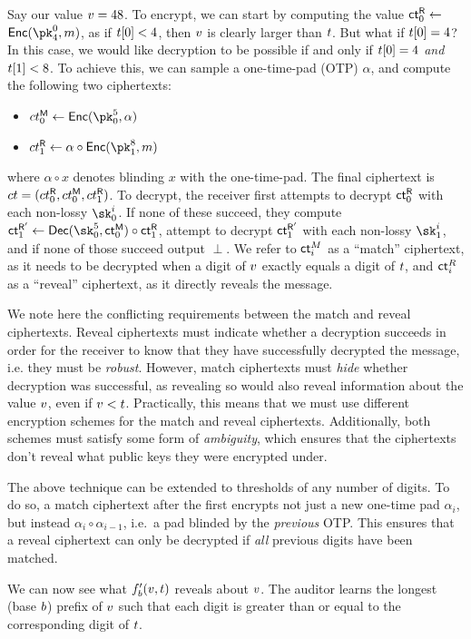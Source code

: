 Say our value $v = 48$. To encrypt, we can start by computing the value $\mathsf{ct}^{\sf R}_0 \gets$ ${\sf Enc}(\pk^0_4, \msg)$, as if $t[0] < 4$, then $v$ is clearly larger than $t$.
But what if $t[0] = 4$? In this case, we would like decryption to be possible if and only if $t[0] = 4$ \textit{and} $t[1] < 8$. To achieve this, we can sample a one-time-pad (OTP) $\alpha$, and compute the following two ciphertexts:
\begin{itemize}
	\item $ct^{\sf M}_0 \gets {\sf Enc}(\pk^5_0, \alpha)$
	\item $ct^{\sf R}_1 \gets \alpha \circ {\sf Enc}(\pk^8_1, m)$
\end{itemize}
where $\alpha \circ x$ denotes blinding $x$ with the one-time-pad. The final ciphertext is $ct = (ct^{\sf R}_0, ct^{\sf M}_0, ct^{\sf R}_1)$.
To decrypt, the receiver first attempts to decrypt $\mathsf{ct}^{\sf R}_0$ with each non-lossy $\sk^i_0$.
If none of these succeed, they compute $\ct^{{\sf R}'}_1 \gets {\sf Dec}(\sk^5_0, \ct^{\sf M}_0) \circ \ct^{\sf R}_1$, attempt to decrypt $\mathsf{ct}^{{\sf R}'}_1$ with each non-lossy $\sk^i_1$, and if none of those succeed output $\perp$.
We refer to $\mathsf{ct}^M_i$ as a ``match'' ciphertext, as it needs to be decrypted when a digit of $v$ exactly equals a digit of $t$, and $\mathsf{ct}^R_i$ as a ``reveal'' ciphertext, as it directly reveals the message.

We note here the conflicting requirements between the match and reveal ciphertexts.
Reveal ciphertexts must indicate whether a decryption succeeds in order for the receiver to know that they have successfully decrypted the message, i.e. they must be \emph{robust}.
However, match ciphertexts must \textit{hide} whether decryption was successful, as revealing so would also reveal information about the value $v$, even if $v < t$.
Practically, this means that we must use different encryption schemes for the match and reveal ciphertexts.
Additionally, both schemes must satisfy some form of \textit{ambiguity}, which ensures that the ciphertexts don't reveal what public keys they were encrypted under.

The above technique can be extended to thresholds of any number of digits.
To do so, a match ciphertext after the first
encrypts not just a new one-time pad $\alpha_i$, but instead $\alpha_i \circ \alpha_{i - 1}$, i.e.\ a pad blinded by the \textit{previous} OTP.
This ensures that a reveal ciphertext can only be decrypted if \textit{all} previous digits have been matched.

We can now see what $f'_b({v, t})$ reveals about $v$.
The auditor learns the longest (base $b$) prefix of $v$ such that each digit is greater than or equal to the corresponding digit of $t$.


